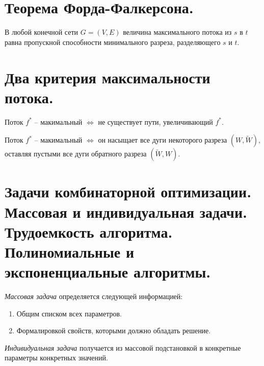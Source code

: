 \section{Теорема Форда-Фалкерсона.}

\begin{theorem}
    В любой конечной сети $ G = (V,E) $ величина максимального потока из $ s $ в $ t $ равна пропускной способности минимального разреза, разделяющего $ s $ и $ t $.
\end{theorem}

\section{Два критерия максимальности потока.}

\begin{theorem}
    Поток $ f^* $ -- макимальный $ \iff $ не существует пути, увеличивающий $ f^* $.
\end{theorem}

\begin{theorem}
    Поток $ f^* $ -- макимальный $ \iff $ он насыщает все дуги некоторого разреза $ (W,\widetilde{W}) $, оставляя пустыми все дуги обратного разреза $ (\widetilde{W},W) $.
\end{theorem}

\section{Задачи комбинаторной оптимизации. Массовая и индивидуальная задачи. Трудоемкость алгоритма. Полиномиальные и экспоненциальные алгоритмы.}

\begin{definition}
    \emph{Массовая задача} определяется следующей информацией:
    \begin{enumerate}
        \item Общим списком всех параметров.
        \item Формалировкой свойств, которыми должно обладать решение.
    \end{enumerate}
\end{definition}

\begin{definition}
    \emph{Индивидуальная задача} получается из массовой подстановкой в конкретные параметры конкретных значений.
\end{definition}

